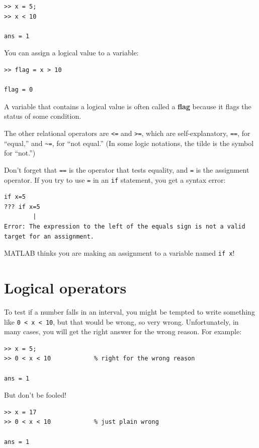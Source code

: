 \documentclass[
]{book}
\begin{document}
\begin{verbatim}
>> x = 5;
>> x < 10

ans = 1
\end{verbatim}

You can assign a logical value to a variable:

\begin{verbatim}
>> flag = x > 10

flag = 0
\end{verbatim}

A variable that contains a logical value is often called a {\bf flag}
because it flags the status of some condition.

The other relational operators are {\tt <=} and {\tt >=}, which are
self-explanatory, {\tt ==}, for ``equal,'' and
\verb+~=+, for ``not equal.''  (In some logic notations, the tilde
is the symbol for ``not.'')

Don't forget that {\tt ==} is the operator that tests equality,
and {\tt =} is the assignment operator.  If you try to use {\tt =} in
an {\tt if} statement, you get a syntax error:

\begin{verbatim}
if x=5
??? if x=5
        |
Error: The expression to the left of the equals sign is not a valid
target for an assignment.
\end{verbatim}

MATLAB thinks you are making an assignment to a variable named {\tt if x}!


\section{Logical operators}
\label{sect:logop}

To test if a number falls in an interval, you might be
tempted to write something like {\tt 0 < x < 10}, but that
would be wrong, so very wrong.  Unfortunately, in many cases,
you will get the right answer for the wrong reason.  For
example:

\begin{verbatim}
>> x = 5;
>> 0 < x < 10            % right for the wrong reason

ans = 1
\end{verbatim}

But don't be fooled!

\begin{verbatim}
>> x = 17
>> 0 < x < 10            % just plain wrong

ans = 1
\end{verbatim}
\end{document}
